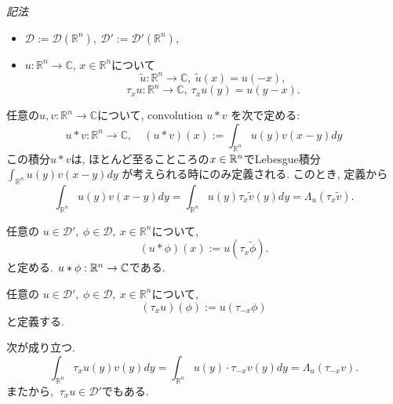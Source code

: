 \textit{記法}

\begin{itemize}
\item \(\mathcal{D} := \mathcal{D}(\mathbb{R}^n), \ \mathcal{D}' := \mathcal{D}'(\mathbb{R}^n),\)
\item  \(u : \mathbb{R}^n \to \mathbb{C}\),  \(x \in \mathbb{R}^n\)について
\[ \widetilde{u} : \mathbb{R}^n \to \mathbb{C}, \ \widetilde{u}(x) = u(-x),\]
\[ \tau_x u : \mathbb{R}^n \to \mathbb{C}, \ \tau_x u(y) = u(y-x).\]
\end{itemize}
任意の\( u,v : \mathbb{R}^n \to \mathbb{C}\)について, convolution \(u \ast v\) を次で定める:
\[
u \ast v : \mathbb{R}^n \to \mathbb{C}, \quad (u \ast v)(x) := \int_{\mathbb{R}^n} u(y) v(x-y) dy
\]
この積分$u \ast v$は, ほとんど至ることころの$x \in \mathbb{R}^n$でLebesgue積分\(\int_{\mathbb{R}^n} u(y)v(x-y)dy\)
が考えられる時にのみ定義される.
このとき, 定義から
\[
\int_{\mathbb{R}^n} u(y) v(x-y) dy 
= \int_{\mathbb{R}^n} u(y) \tau_x \widetilde{v}(y) dy 
= \Lambda_u(\tau_x \widetilde{v}).
\]


\begin{tcolorbox}[mybox]
\begin{defn}%
\label{defn-H-2.7}
任意の \(u \in \mathcal{D}', \ \phi \in \mathcal{D}, \ x \in \mathbb{R}^n\)について, 
\[
(u \ast \phi)(x) := u(\tau_x \widetilde{\phi}).
\]
と定める. $u \ast \phi : \mathbb{R}^n \to \mathbb{C}$である. 
\end{defn}
\end{tcolorbox}


\begin{tcolorbox}[mybox]
\begin{defn}%
\label{defn-H-2.8}
任意の \(u \in \mathcal{D}', \ \phi \in \mathcal{D}, \ x \in \mathbb{R}^n\)について, 
\[
(\tau_x u)(\phi) := u(\tau_{-x} \phi)
\]
と定義する. 
\end{defn}
\end{tcolorbox}

\begin{rem}
次が成り立つ. 
\[
\int_{\mathbb{R}^n} \tau_x u(y) v(y) dy 
= \int_{\mathbb{R}^n} u(y) \cdot \tau_{-x} v(y) dy
= \Lambda_u(\tau_{-x} v).
\]
また\cite[Theorem 6.8]{Rud}から, \(\ \tau_x u \in \mathcal{D}' \)でもある. 
\end{rem}

